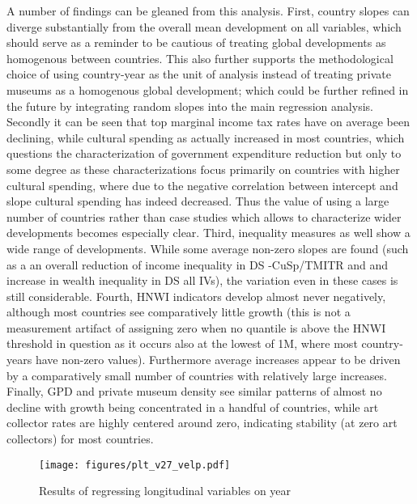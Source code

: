 \documentclass[11pt]{article}
\begin{document}
A number of findings can be gleaned from this analysis.
First, country slopes can diverge substantially from the overall mean development on all variables, which should serve as a reminder to be cautious of treating global developments as homogenous between countries. 
This also further supports the methodological choice of using country-year as the unit of analysis instead of treating private museums as a homogenous global development; which could be further refined in the future by integrating random slopes into the main regression analysis.
Secondly it can be seen that top marginal income tax rates have on average been declining, while cultural spending as actually increased in most countries, which questions the characterization of government expenditure reduction but only to some degree as these characterizations focus primarily on countries with higher cultural spending, where due to the negative correlation between intercept and slope cultural spending has indeed decreased.
Thus the value of using a large number of countries rather than case studies which allows to characterize wider developments becomes especially clear.
Third, inequality measures as well show a wide range of developments.
While some average non-zero slopes are found (such as a an overall reduction of income inequality in DS -CuSp/TMITR and and increase in wealth inequality in DS all IVs), the variation even in these cases is still considerable. 
Fourth, HNWI indicators develop almost never negatively, although most countries see comparatively little growth (this is not a measurement artifact of assigning zero when no quantile is above the HNWI threshold in question as it occurs also at the lowest of 1M, where most country-years have non-zero values).
Furthermore average increases appear to be driven by a comparatively small number of countries with relatively large increases. 
Finally, GPD and private museum density see similar patterns of almost no decline with growth being concentrated in a handful of countries, while art collector rates are highly centered around zero, indicating stability (at zero art collectors) for most countries. 



\begin{landscape}

\begin{figure}[htbp]
\centering
\texttt{[image: figures/plt\_v27\_velp.pdf]}
\caption{\label{fig:velp}Results of regressing longitudinal variables on year}
\end{figure}

\end{landscape}


\begin{sloppypar}
\printbibliography[segment=\therefsegment]
\end{sloppypar}
\end{document}
